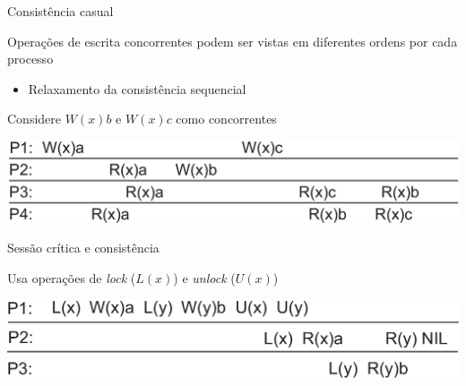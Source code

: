 \documentclass[compress]{beamer}
\begin{document}
\begin{frame}{Consistência casual}

Operações de escrita concorrentes podem ser vistas em diferentes ordens por cada processo
\begin{itemize}
    \item Relaxamento da consistência sequencial
\end{itemize}

\vspace{0.5cm}

Considere $W(x)b$ e $W(x)c$ como concorrentes

\vspace{1cm}

\centering \includegraphics[width=\textwidth]{images/casual.png}
\end{frame}


\begin{frame}{Sessão crítica e consistência}

Usa operações de \textit{lock} ($L(x)$) e \textit{unlock} ($U(x)$)

\vspace{1cm}

\centering \includegraphics[width=\textwidth]{images/lock.png}
\end{frame}
\end{document}
